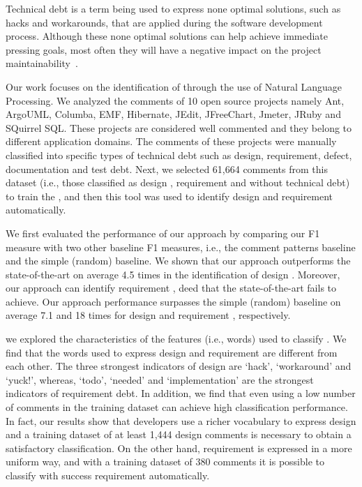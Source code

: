 Technical debt is a term being used to express none optimal solutions, such as hacks and workarounds, that are applied during the software development process. Although these none optimal solutions can help achieve immediate pressing goals, most often they will have a negative impact on the project maintainability~\cite{Zazworka2011MTD}. 

Our work focuses on the identification of \SATD through the use of Natural Language Processing. We analyzed the comments of 10 open source projects namely Ant, ArgoUML, Columba, EMF, Hibernate, JEdit, JFreeChart, Jmeter, JRuby and SQuirrel SQL. These projects are considered well commented and they belong to different application domains. The comments of these projects were manually classified into specific types of technical debt such as design, requirement, defect, documentation and test debt. Next, we selected 61,664 comments from this dataset (i.e., those classified as design \SATD, requirement \SATD and without technical debt) to train the , and then this tool was used to identify  design and requirement \SATD automatically.

We first evaluated the performance of our approach by comparing our F1 measure with two other baseline F1 measures, i.e., the comment patterns baseline and the simple (random) baseline. We shown that our approach outperforms the state-of-the-art on average 4.5 times in the identification of design \SATD. Moreover, our approach can identify requirement \SATD, deed that the state-of-the-art fails to achieve. Our approach performance surpasses the simple (random) baseline on average 7.1 and 18 times for design and requirement \SATD, respectively. 

 we explored the characteristics of the features (i.e., words) used to classify \SATD. We find that the words used to express design and requirement \SATD are different from each other. The three strongest indicators of design \SATD are `hack', `workaround' and `yuck!', whereas, `todo', `needed' and `implementation' are the strongest indicators of requirement debt. In addition, we find that even using a low number of \SATD comments in the training dataset can achieve high classification performance. In fact, our results show that developers use a richer vocabulary to express design \SATD and a training dataset of at least 1,444 design \SATD comments is necessary to obtain a satisfactory classification. On the other hand, requirement \SATD is expressed in a more uniform way, and with a training dataset of 380 \SATD comments it is possible to classify with success requirement \SATD automatically.

